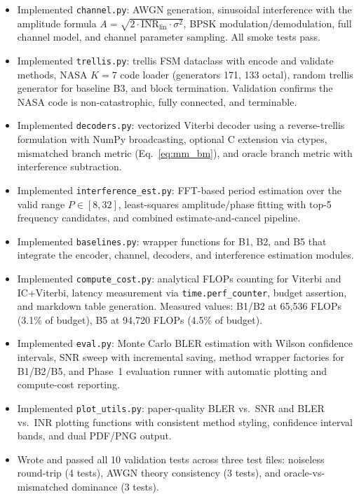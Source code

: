 \documentclass[11pt,a4paper]{article}
\newcommand{\inr}{\text{INR}}
\begin{document}
\begin{itemize}
  \item[$\bullet$] Implemented \texttt{channel.py}: AWGN generation, sinusoidal interference with the amplitude formula $A = \sqrt{2 \cdot \inr_{\text{lin}} \cdot \sigma^2}$, BPSK modulation/demodulation, full channel model, and channel parameter sampling. All smoke tests pass.
  \item[$\bullet$] Implemented \texttt{trellis.py}: trellis FSM dataclass with encode and validate methods, NASA $K{=}7$ code loader (generators 171, 133 octal), random trellis generator for baseline B3, and block termination. Validation confirms the NASA code is non-catastrophic, fully connected, and terminable.
  \item[$\bullet$] Implemented \texttt{decoders.py}: vectorized Viterbi decoder using a reverse-trellis formulation with NumPy broadcasting, optional C extension via ctypes, mismatched branch metric (Eq.~\ref{eq:mm_bm}), and oracle branch metric with interference subtraction.
  \item[$\bullet$] Implemented \texttt{interference\_est.py}: FFT-based period estimation over the valid range $P \in [8, 32]$, least-squares amplitude/phase fitting with top-5 frequency candidates, and combined estimate-and-cancel pipeline.
  \item[$\bullet$] Implemented \texttt{baselines.py}: wrapper functions for B1, B2, and B5 that integrate the encoder, channel, decoders, and interference estimation modules.
  \item[$\bullet$] Implemented \texttt{compute\_cost.py}: analytical FLOPs counting for Viterbi and IC+Viterbi, latency measurement via \texttt{time.perf\_counter}, budget assertion, and markdown table generation. Measured values: B1/B2 at 65,536 FLOPs (3.1\% of budget), B5 at 94,720 FLOPs (4.5\% of budget).
  \item[$\bullet$] Implemented \texttt{eval.py}: Monte Carlo BLER estimation with Wilson confidence intervals, SNR sweep with incremental saving, method wrapper factories for B1/B2/B5, and Phase~1 evaluation runner with automatic plotting and compute-cost reporting.
  \item[$\bullet$] Implemented \texttt{plot\_utils.py}: paper-quality BLER vs.\ SNR and BLER vs.\ INR plotting functions with consistent method styling, confidence interval bands, and dual PDF/PNG output.
  \item[$\bullet$] Wrote and passed all 10 validation tests across three test files: noiseless round-trip (4 tests), AWGN theory consistency (3 tests), and oracle-vs-mismatched dominance (3 tests).
\end{itemize}
\end{document}
